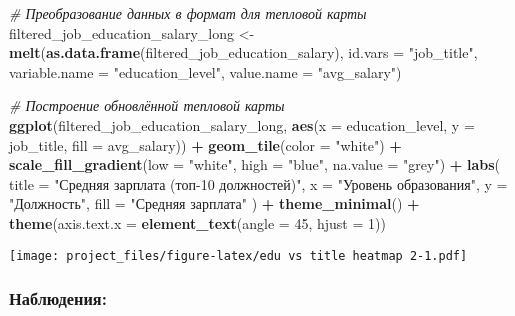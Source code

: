 \documentclass[
]{article}
\newenvironment{Shaded}{\begin{snugshade}}{\end{snugshade}}
\newcommand{\AttributeTok}[1]{\textcolor[rgb]{0.13,0.29,0.53}{#1}}
\newcommand{\CommentTok}[1]{\textcolor[rgb]{0.56,0.35,0.01}{\textit{#1}}}
\newcommand{\DecValTok}[1]{\textcolor[rgb]{0.00,0.00,0.81}{#1}}
\newcommand{\FunctionTok}[1]{\textcolor[rgb]{0.13,0.29,0.53}{\textbf{#1}}}
\newcommand{\NormalTok}[1]{#1}
\newcommand{\OtherTok}[1]{\textcolor[rgb]{0.56,0.35,0.01}{#1}}
\newcommand{\SpecialCharTok}[1]{\textcolor[rgb]{0.81,0.36,0.00}{\textbf{#1}}}
\newcommand{\StringTok}[1]{\textcolor[rgb]{0.31,0.60,0.02}{#1}}
\begin{document}
\begin{Shaded}
\begin{Highlighting}[]
\CommentTok{\# Преобразование данных в формат для тепловой карты}
\NormalTok{filtered\_job\_education\_salary\_long }\OtherTok{\textless{}{-}} \FunctionTok{melt}\NormalTok{(}\FunctionTok{as.data.frame}\NormalTok{(filtered\_job\_education\_salary), }\AttributeTok{id.vars =} \StringTok{"job\_title"}\NormalTok{, }\AttributeTok{variable.name =} \StringTok{"education\_level"}\NormalTok{, }\AttributeTok{value.name =} \StringTok{"avg\_salary"}\NormalTok{)}

\CommentTok{\# Построение обновлённой тепловой карты}
\FunctionTok{ggplot}\NormalTok{(filtered\_job\_education\_salary\_long, }\FunctionTok{aes}\NormalTok{(}\AttributeTok{x =}\NormalTok{ education\_level, }\AttributeTok{y =}\NormalTok{ job\_title, }\AttributeTok{fill =}\NormalTok{ avg\_salary)) }\SpecialCharTok{+}
  \FunctionTok{geom\_tile}\NormalTok{(}\AttributeTok{color =} \StringTok{"white"}\NormalTok{) }\SpecialCharTok{+}
  \FunctionTok{scale\_fill\_gradient}\NormalTok{(}\AttributeTok{low =} \StringTok{"white"}\NormalTok{, }\AttributeTok{high =} \StringTok{"blue"}\NormalTok{, }\AttributeTok{na.value =} \StringTok{"grey"}\NormalTok{) }\SpecialCharTok{+}
  \FunctionTok{labs}\NormalTok{(}
    \AttributeTok{title =} \StringTok{"Средняя зарплата (топ{-}10 должностей)"}\NormalTok{,}
    \AttributeTok{x =} \StringTok{"Уровень образования"}\NormalTok{,}
    \AttributeTok{y =} \StringTok{"Должность"}\NormalTok{,}
    \AttributeTok{fill =} \StringTok{"Средняя зарплата"}
\NormalTok{  ) }\SpecialCharTok{+}
  \FunctionTok{theme\_minimal}\NormalTok{() }\SpecialCharTok{+}
  \FunctionTok{theme}\NormalTok{(}\AttributeTok{axis.text.x =} \FunctionTok{element\_text}\NormalTok{(}\AttributeTok{angle =} \DecValTok{45}\NormalTok{, }\AttributeTok{hjust =} \DecValTok{1}\NormalTok{))}
\end{Highlighting}
\end{Shaded}

\texttt{[image: project\_files/figure-latex/edu vs title heatmap 2-1.pdf]}

\subsubsection{Наблюдения:}\label{ux43dux430ux431ux43bux44eux434ux435ux43dux438ux44f-13}
\end{document}
